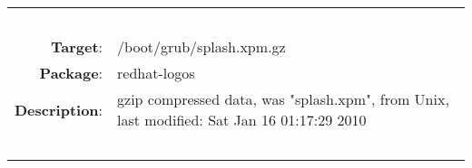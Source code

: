 \begin{longtable}{rl}
\hline
\multicolumn{2}{l}{\ }\\
\textbf{Target}: & /boot/grub/splash.xpm.gz\\
\textbf{Package}: & redhat-logos\\
\textbf{Description}: & gzip compressed data, was "splash.xpm", from Unix, last modified: Sat Jan 16 01:17:29 2010\\
\multicolumn{2}{l}{\ }\\
\hline
\end{longtable}
